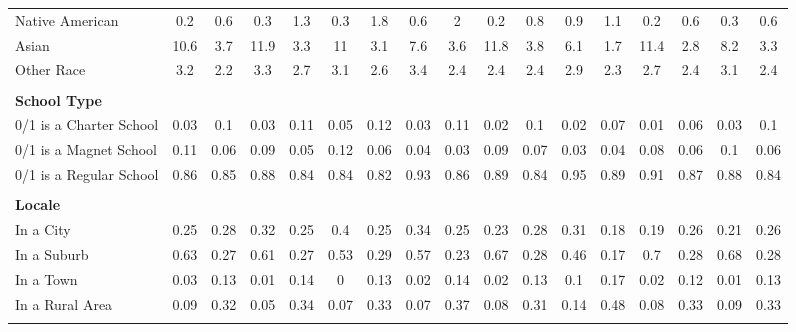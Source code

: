 \begin{tabular*}{\linewidth}{@{\extracolsep{\fill} } lcccccccccccccccc}
\hspace{0.2cm}Native American&0.2&0.6&0.3&1.3&0.3&1.8&0.6&2&0.2&0.8&0.9&1.1&0.2&0.6&0.3&0.6\\%
\hspace{0.2cm}Asian&10.6&3.7&11.9&3.3&11&3.1&7.6&3.6&11.8&3.8&6.1&1.7&11.4&2.8&8.2&3.3\\%
\hspace{0.2cm}Other Race&3.2&2.2&3.3&2.7&3.1&2.6&3.4&2.4&2.4&2.4&2.9&2.3&2.7&2.4&3.1&2.4\\%
&&&&&&&&&&&&&&&&\\%
\multicolumn{17}{l}{\bfseries School Type}\\%
\hspace{0.2cm}0/1 is a Charter School&0.03&0.1&0.03&0.11&0.05&0.12&0.03&0.11&0.02&0.1&0.02&0.07&0.01&0.06&0.03&0.1\\%
\hspace{0.2cm}0/1 is a Magnet School&0.11&0.06&0.09&0.05&0.12&0.06&0.04&0.03&0.09&0.07&0.03&0.04&0.08&0.06&0.1&0.06\\%
\hspace{0.2cm}0/1 is a Regular School&0.86&0.85&0.88&0.84&0.84&0.82&0.93&0.86&0.89&0.84&0.95&0.89&0.91&0.87&0.88&0.84\\%
&&&&&&&&&&&&&&&&\\%
\multicolumn{17}{l}{\bfseries Locale}\\%
\hspace{0.2cm}In a City&0.25&0.28&0.32&0.25&0.4&0.25&0.34&0.25&0.23&0.28&0.31&0.18&0.19&0.26&0.21&0.26\\%
\hspace{0.2cm}In a Suburb&0.63&0.27&0.61&0.27&0.53&0.29&0.57&0.23&0.67&0.28&0.46&0.17&0.7&0.28&0.68&0.28\\%
\hspace{0.2cm}In a Town&0.03&0.13&0.01&0.14&0&0.13&0.02&0.14&0.02&0.13&0.1&0.17&0.02&0.12&0.01&0.13\\%
\hspace{0.2cm}In a Rural Area&0.09&0.32&0.05&0.34&0.07&0.33&0.07&0.37&0.08&0.31&0.14&0.48&0.08&0.33&0.09&0.33\\%
&&&&&&&&&&&&&&&&\\%
\hline%
\end{tabular*}